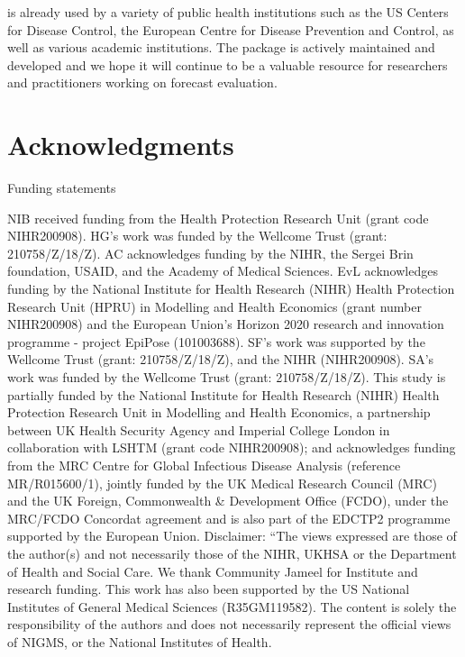 \documentclass[
]{jss}
\begin{document}
 is already used by a variety of public health
institutions such as the US Centers for Disease Control, the European
Centre for Disease Prevention and Control, as well as various academic
institutions. The package is actively maintained and developed and we
hope it will continue to be a valuable resource for researchers and
practitioners working on forecast evaluation.

\section{Acknowledgments}\label{acknowledgments}

Funding statements

NIB received funding from the Health Protection Research Unit (grant
code NIHR200908). HG's work was funded by the Wellcome Trust (grant:
210758/Z/18/Z). AC acknowledges funding by the NIHR, the Sergei Brin
foundation, USAID, and the Academy of Medical Sciences. EvL acknowledges
funding by the National Institute for Health Research (NIHR) Health
Protection Research Unit (HPRU) in Modelling and Health Economics (grant
number NIHR200908) and the European Union's Horizon 2020 research and
innovation programme - project EpiPose (101003688). SF's work was
supported by the Wellcome Trust (grant: 210758/Z/18/Z), and the NIHR
(NIHR200908). SA's work was funded by the Wellcome Trust (grant:
210758/Z/18/Z). This study is partially funded by the National Institute
for Health Research (NIHR) Health Protection Research Unit in Modelling
and Health Economics, a partnership between UK Health Security Agency
and Imperial College London in collaboration with LSHTM (grant code
NIHR200908); and acknowledges funding from the MRC Centre for Global
Infectious Disease Analysis (reference MR/R015600/1), jointly funded by
the UK Medical Research Council (MRC) and the UK Foreign, Commonwealth
\& Development Office (FCDO), under the MRC/FCDO Concordat agreement and
is also part of the EDCTP2 programme supported by the European Union.
Disclaimer: ``The views expressed are those of the author(s) and not
necessarily those of the NIHR, UKHSA or the Department of Health and
Social Care. We thank Community Jameel for Institute and research
funding. This work has also been supported by the US National Institutes
of General Medical Sciences (R35GM119582). The content is solely the
responsibility of the authors and does not necessarily represent the
official views of NIGMS, or the National Institutes of Health.


\end{document}
